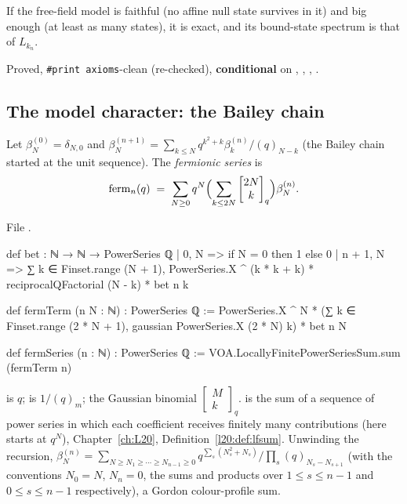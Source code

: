 \begin{physics}
If the free-field model is faithful (no affine null state survives in it) and big enough (at least as many states), it
is exact, and its bound-state spectrum is that of $L_{k_n}$.
\end{physics}

\begin{status}
Proved, \texttt{\#print axioms}-clean (re-checked), \textbf{conditional} on , , ,
.
\end{status}

\subsection{The model character: the Bailey chain}\label{l29:sec:modelchar}

\begin{definition}\label{l29:def:ferm}
Let $\beta^{(0)}_N=\delta_{N,0}$ and $\beta^{(n+1)}_N=\sum_{k\le N}q^{k^2+k}\beta^{(n)}_k/(q)_{N-k}$ (the Bailey chain
started at the unit sequence). The \emph{fermionic series} is
\begin{equation*}
\mathrm{ferm}_n(q)\;=\;\sum_{N\ge0}q^N\Bigl(\sum_{k\le 2N}\begin{bmatrix}2N\\k\end{bmatrix}_q\Bigr)\beta^{(n)}_N .
\end{equation*}
\end{definition}

\noindent File .
\begin{leancode}
def bet : ℕ → ℕ → PowerSeries ℚ
  | 0, N => if N = 0 then 1 else 0
  | n + 1, N => ∑ k ∈ Finset.range (N + 1),
      PowerSeries.X ^ (k * k + k) * reciprocalQFactorial (N - k) * bet n k

def fermTerm (n N : ℕ) : PowerSeries ℚ :=
  PowerSeries.X ^ N * (∑ k ∈ Finset.range (2 * N + 1), gaussian PowerSeries.X (2 * N) k) *
    bet n N

def fermSeries (n : ℕ) : PowerSeries ℚ := VOA.LocallyFinitePowerSeriesSum.sum (fermTerm n)
\end{leancode}

\begin{dictionary}
 is $q$;  is $1/(q)_m$;  the Gaussian
binomial $\left[\begin{smallmatrix}M\\k\end{smallmatrix}\right]_q$.  is the sum of
a sequence of power series in which each coefficient receives finitely many contributions (here 
starts at $q^N$), Chapter~\ref{ch:L20}, Definition~\ref{l20:def:lfsum}. Unwinding the recursion,
$\beta^{(n)}_N=\sum_{N\ge N_1\ge\cdots\ge N_{n-1}\ge0}q^{\sum_s(N_s^2+N_s)}/\prod_s(q)_{N_s-N_{s+1}}$ (with the
conventions $N_0=N$, $N_n=0$, the sums and products over $1\le s\le n-1$ and $0\le s\le n-1$ respectively), a Gordon
colour-profile sum.
\end{dictionary}


